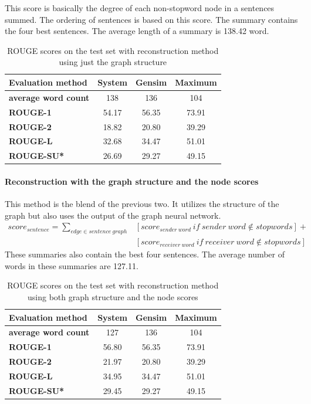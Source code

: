 This score is basically the degree of each non-stopword node in a sentences summed. The ordering of sentences is based on this score. The summary contains the four best sentences. The average length of a summary is 138.42 word.

\begin{table}[!ht]
	\centering
	\begin{tabular}{| l | c | c | c |}
		\hline
		\textbf{Evaluation method}&\textbf{System}&\textbf{Gensim}&\textbf{Maximum}\\ \hline \hline
		
		\textbf{average word count}&138&136&104 \\ \hline
		\textbf{ROUGE-1}&54.17&56.35&73.91 \\ \hline
		\textbf{ROUGE-2}&18.82&20.80&39.29 \\ \hline
		\textbf{ROUGE-L}&32.68&34.47&51.01 \\ \hline
		\textbf{ROUGE-SU*}&26.69&29.27&49.15 \\ \hline
	\end{tabular}
	\caption{ROUGE scores on the test set with reconstruction method using just the graph structure}
	\label{tab:structure}
\end{table}
\FloatBarrier

\paragraph{Reconstruction with the graph structure and the node scores}

This method is the blend of the previous two. It utilizes the structure of the graph but also uses the output of the graph neural network.
\begin{eqnarray*}
	score_{sentence} = \sum_{edge \in sentence\ graph} &[score_{sender\ word}\ if\ sender\ word \notin stopwords] + \\&[score_{receiver\ word}\ if\ receiver\ word \notin stopwords]
\end{eqnarray*}
These summaries also contain the best four sentences. The average number of words in these summaries are 127.11.
\begin{table}[!ht]
	\centering
	\begin{tabular}{| l | c | c | c |}
		\hline
		\textbf{Evaluation method}&\textbf{System}&\textbf{Gensim}&\textbf{Maximum}\\ \hline \hline
		\textbf{average word count}&127&136&104 \\ \hline
		\textbf{ROUGE-1}&56.80&56.35&73.91 \\ \hline
		\textbf{ROUGE-2}&21.97&20.80&39.29 \\ \hline
		\textbf{ROUGE-L}&34.95&34.47&51.01 \\ \hline
		\textbf{ROUGE-SU*}&29.45&29.27&49.15 \\ \hline
	\end{tabular}
	\caption{ROUGE scores on the test set with reconstruction method using both graph structure and the node scores}
	\label{tab:simple_complete}
\end{table}

